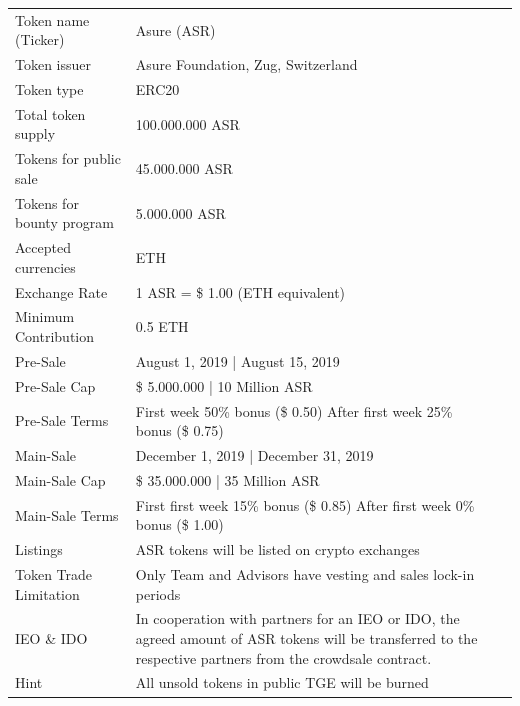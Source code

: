 \begin{table}[H]
\begin{tabular}{lp{}l}
  Token name (Ticker) & Asure (ASR) \\  
  Token issuer & Asure Foundation, Zug, Switzerland\\
  Token type & ERC20\\
  Total token supply & 100.000.000 ASR \\
  Tokens for public sale & 45.000.000 ASR \\
  Tokens for bounty program & 5.000.000 ASR \\
  Accepted currencies & ETH \\
  Exchange Rate & 1 ASR = \$ 1.00 (ETH equivalent) \\
  Minimum Contribution & 0.5 ETH \\\hline  
 
  Pre-Sale & August 1, 2019 | August 15, 2019 \\
  Pre-Sale Cap & \$ 5.000.000 | 10 Million ASR\\
  Pre-Sale Terms & First week 50\% bonus (\$ 0.50) \newline
                   After first week 25\% bonus (\$ 0.75)\\\hline
  
  Main-Sale & December 1, 2019 | December 31, 2019 \\
  Main-Sale Cap & \$ 35.000.000 | 35 Million ASR\\
  Main-Sale Terms & First first week 15\% bonus (\$ 0.85)\newline
                    After first week 0\% bonus (\$ 1.00)\\\hline


  Listings & ASR tokens will be listed on crypto exchanges \\
  Token Trade Limitation & Only Team and Advisors have vesting and sales lock-in periods \\
  IEO \& IDO & In cooperation with partners for an IEO or IDO, the agreed amount of ASR tokens will be transferred to the respective partners from the crowdsale contract. \\
  Hint & All unsold tokens in public TGE  will be burned \\\hline     


\end{tabular}
\end{table}
